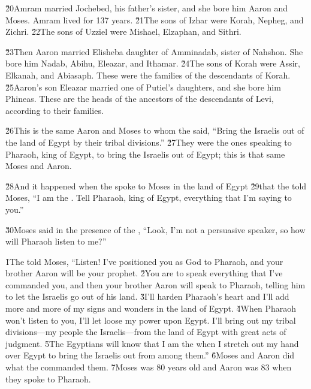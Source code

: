 \v{20}Amram married Jochebed, his father's sister, and she bore him Aaron and Moses. Amram lived for 137 years. \v{21}The sons of Izhar were Korah, Nepheg, and Zichri. \v{22}The sons of Uzziel were Mishael, Elzaphan, and Sithri.

\v{23}Then Aaron married Elisheba daughter of Amminadab, sister of Nahshon. She bore him Nadab, Abihu, Eleazar, and Ithamar. \v{24}The sons of Korah were Assir, Elkanah, and Abiasaph. These were the families of the descendants of Korah. \v{25}Aaron's son Eleazar married one of Putiel's daughters, and she bore him Phineas. These are the heads of the ancestors of the descendants of Levi, according to their families.

\v{26}This is the same Aaron and Moses to whom the  said, ``Bring the Israelis out of the land of Egypt by their tribal divisions.'' \v{27}They were the ones speaking to Pharaoh, king of Egypt, to bring the Israelis out of Egypt; this is that same Moses and Aaron.

\v{28}And it happened when the  spoke to Moses in the land of Egypt \v{29}that the  told Moses, ``I am the . Tell Pharaoh, king of Egypt, everything that I'm saying to you.''

\v{30}Moses said in the presence of the , ``Look, I'm not a persuasive speaker, so how will Pharaoh listen to me?''

\v{1}The  told Moses, ``Listen! I've positioned you as God to Pharaoh, and your brother Aaron will be your prophet. \v{2}You are to speak everything that I've commanded you, and then your brother Aaron will speak to Pharaoh, telling him to let the Israelis go out of his land. \v{3}I'll harden Pharaoh's heart and I'll add more and more of my signs and wonders in the land of Egypt. \v{4}When Pharaoh won't listen to you, I'll let loose my power upon Egypt. I'll bring out my tribal divisions---my people the Israelis---from the land of Egypt with great acts of judgment. \v{5}The Egyptians will know that I am the  when I stretch out my hand over Egypt to bring the Israelis out from among them.'' \v{6}Moses and Aaron did what the  commanded them. \v{7}Moses was 80 years old and Aaron was 83 when they spoke to Pharaoh.

